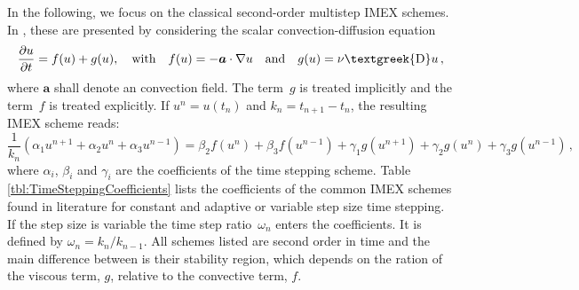 \documentclass[review]{revtex4-1}
\newcommand{\laplace}{\text{\textgreek{D}}}
\newcommand{\p}{\partial}
\newcommand{\pd}[2]{\frac{\p #1}{\p #2}}
\begin{document}
In the following, we focus on the classical second-order multistep IMEX schemes. In \cite{Ascher1995}, these are presented by considering the scalar convection-diffusion equation
\begin{equation}
	\pd{u}{t}=f(u)+g(u),\quad\text{with}\quad
	f(u)=-\bm{a}\cdot\nabla u\quad\text{and}\quad
	g(u)=\nu\laplace u\,,
\end{equation}
where $\bm{a}$ shall denote an convection field. The term~$g$ is treated implicitly and the term~$f$ is treated explicitly. If $u^n=u(t_n)$ and $k_n=t_{n+1}-t_n$, the resulting IMEX scheme reads:
\begin{equation}
	\frac{1}{k_n}\left(\alpha_1 u^{n+1}+ \alpha_2 u^{n}+\alpha_3 u^{n-1}\right)=\beta_2 f(u^n) + \beta_3 f(u^{n-1})+\gamma_1 g(u^{n+1}) +\gamma_2 g(u^n)+\gamma_3 g(u^{n-1})\,,
\end{equation}
where $\alpha_i$, $\beta_i$ and $\gamma_i$ are the coefficients of the time stepping scheme. Table\,\ref{tbl:TimeSteppingCoefficients} lists the coefficients of the common IMEX schemes found in literature for constant and adaptive or variable step size time stepping. If the step size is variable the time step ratio~$\omega_n$ enters the coefficients. It is defined by $\omega_n=k_n/k_{n-1}$. All schemes listed are second order in time and the main difference between is their stability region, which depends on the ration of the viscous term, $g$, relative to the convective term, $f$.
\end{document}
